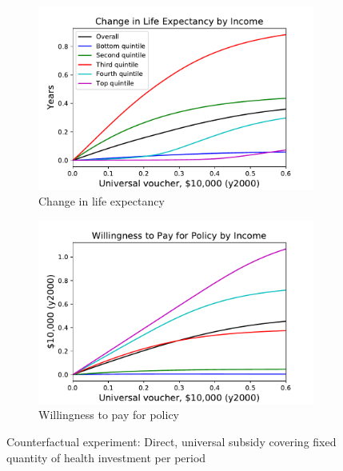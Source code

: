 \documentclass[12pt,pdftex,letterpaper]{article}
\begin{document}
\begin{figure}[h!]
\begin{subfigure}[b]{0.49\textwidth}
        \includegraphics[width=\textwidth]{../Figures/UniversalSubLifeExp.pdf}
        \caption{Change in life expectancy}
    \end{subfigure}
    \begin{subfigure}[b]{0.49\textwidth}
        \centering
        \includegraphics[width=\textwidth]{../Figures/UniversalSubWTP.pdf}
        \caption{Willingness to pay for policy}
    \end{subfigure}
    \caption{Counterfactual experiment: Direct, universal subsidy covering fixed quantity of health investment per period}
    \label{fig:UniversalSub}
\end{figure}


\newpage
\end{document}
